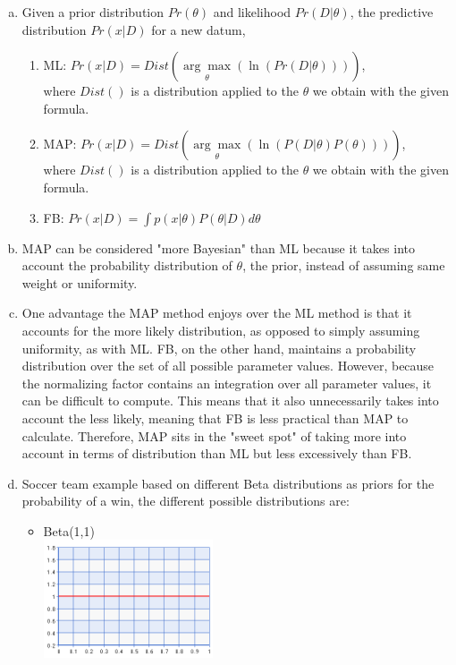 \documentclass[11pt]{article}
\begin{document}
\begin{enumerate}[a.]
\item Given a prior distribution $Pr(\theta)$ and likelihood $Pr(D|\theta)$, the predictive distribution $Pr(x|D)$ for a new datum,
\begin{enumerate}
\item ML: $Pr(x|D)=Dist(\underset{\theta}{\arg\max}(\ln(Pr(D|\theta))))$, \\where $Dist()$ is a distribution applied to the $\theta$ we obtain with the given formula.
\item MAP: $Pr(x|D)=Dist(\underset{\theta}{\arg\max}(\ln(P(D|\theta)P(\theta))))$, \\where $Dist()$ is a distribution applied to the $\theta$ we obtain with the given formula.
\item FB: $Pr(x|D)=\int p(x|\theta) P(\theta|D)d\theta$
\end{enumerate}
\item MAP can be considered "more Bayesian" than ML because it takes into account the probability distribution of $\theta$, the prior, instead of assuming same weight or uniformity.
\item One advantage the MAP method enjoys over the ML method is that it accounts for the more likely distribution, as opposed to simply assuming uniformity, as with ML. FB, on the other hand, maintains a probability distribution over the set of all possible  parameter values. However, because the normalizing factor contains an integration over all parameter values, it can be difficult to compute. This means that it also unnecessarily takes into account the less likely, meaning that FB is less practical than MAP to calculate. Therefore, MAP sits in the "sweet spot" of taking more into account in terms of distribution than ML but less excessively than FB.
\item Soccer team example based on different Beta distributions as priors for the probability of a win, the different possible distributions are:
\begin{itemize}
\item Beta(1,1)\\
\includegraphics[width=50mm]{beta11.png}\\

\end{itemize}
\end{enumerate}
\end{document}
